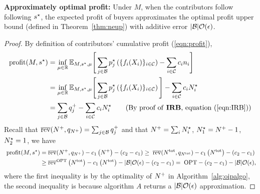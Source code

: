 \noindent
    \textbf{Approximately optimal profit:}
    Under $M$, when the contributors follow following $s^\star$, the expected profit of buyers approximates the optimal profit upper bound (defined in Theorem~\ref{thm:neup}) with additive error $|\mathcal{B}|\mathcal{O}(\epsilon)$.
\begin{proof}
    By definition of contributors' cumulative profit (\ref{eqn:profit}), 
    \begin{align*}
     \profit(M, \stratopt) & = \inf_{\mu\in\RR} \EE_{M, \stratopt, \mu}\Bigg[
        \sum_{j\in\buyers} \priceoptj\left( \{\subfunci(\initdatai)\}_{i\in\contributors}\right) -
            \sum_{i\in\contributors}\costi\nni
        \Bigg]    \\ & =  \inf_{\mu\in\RR} \EE_{M, \stratopt, \mu}\Bigg[
        \sum_{j\in\buyers} \priceoptj\left( \{\subfunci(\initdatai)\}_{i\in\contributors}\right) 
        \Bigg]  -\sum_{i\in\contributors}\costi\nnopti  \\ & =   \sum_{j\in \buyers} \pricejA -\sum_{i\in\contributors}\costi\nnopti \tag*{(By proof of \textbf{IRB}, equation (\ref{eqn:IRB}))}
\end{align*}
Recall that $\overline{\mathrm{rev}}(N^{+}, q_{N^{+}}) = \sum_{j\in \mathcal{B}} q_j^{+}$ and that $N^{+} = \sum_i {N^\star_i} $, $N^\star_1 = N^{+}-1$, $N^\star_2 = 1$, we have 
   \begin{align*}
        ~{\rm profit}(M, s^\star)  =& \;  
        \overline{\mathrm{rev}}(N^{+}, q_{N^{+}}) -c_1 \left(N^{+}\right) -(c_2 - c_1)
         \geq  \; \overline{\mathrm{rev}}(N^{\rm tot}, q_{N^{\rm tot}}) -c_1 \left(N^{\rm tot}\right) -(c_2 - c_1)
       \\  \geq &  \; 
       \overline{\mathrm{rev}}^{\rm OPT}
        \left( 
            N^{\rm tot} 
        \right) 
        -  c_1 \left(N^{\rm tot}\right) - |\mathcal{B}|\mathcal{O}(\epsilon)-  (c_2 -c_1)   
        =   \; {\rm OPT} - (c_2 - c_1)- |\mathcal{B}|\mathcal{O}(\epsilon),
    \end{align*}
where the first inequality is by the optimality of $N^{+}$ in Algorithm~\ref{alg:oipalgo}, the second inequality is because algorithm $A$ returns a 
$|\mathcal{B}|\mathcal{O}(\epsilon)$ approximation.

\end{proof}